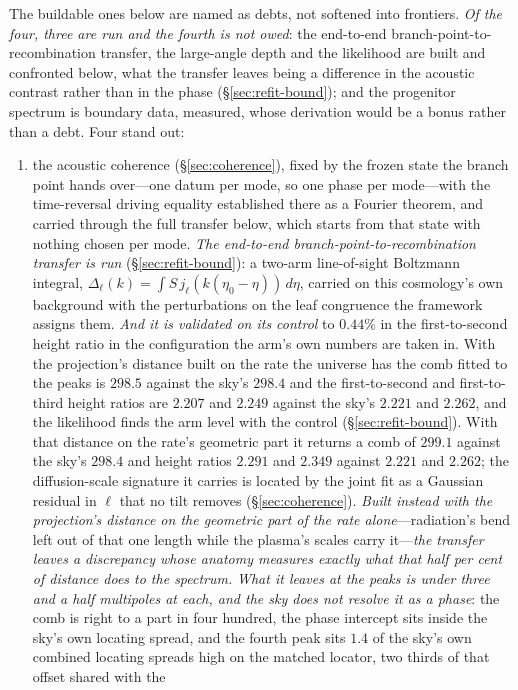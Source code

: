 \documentclass[11pt,a4paper]{article}
\theoremstyle{plain}
\theoremstyle{definition}
\theoremstyle{remark}
\begin{document}
The buildable ones below are named as debts, not softened into frontiers. \emph{Of the four, three are run and the fourth is not owed}: the end-to-end branch-point-to-recombination transfer, the large-angle depth and the likelihood are built and confronted below, what the transfer leaves being a difference in the acoustic contrast rather than in the phase (\S\ref{sec:refit-bound}); and the progenitor spectrum is boundary data, measured, whose derivation would be a bonus rather than a debt. Four stand out:
\begin{enumerate}
\item the acoustic coherence (\S\ref{sec:coherence}), fixed by the frozen state the branch point hands over---one datum per mode, so one phase per mode---with the time-reversal driving equality established there as a Fourier theorem, and carried through the full transfer below, which starts from that state with nothing chosen per mode. \emph{The end-to-end branch-point-to-recombination transfer is run} (\S\ref{sec:refit-bound}): a two-arm line-of-sight Boltzmann integral, $\Delta_\ell(k)=\int S\,j_\ell(k(\eta_0-\eta))\,d\eta$, carried on this cosmology's own background with the perturbations on the leaf congruence the framework assigns them. \emph{And it is validated on its control} to $0.44\%$ in the first-to-second height ratio in the configuration the arm's own numbers are taken in. With the projection's distance built on the rate the universe has the comb fitted to the peaks is $298.5$ against the sky's $298.4$ and the first-to-second and first-to-third height ratios are $2.207$ and $2.249$ against the sky's $2.221$ and $2.262$, and the likelihood finds the arm level with the control (\S\ref{sec:refit-bound}). With that distance on the rate's geometric part it returns a comb of $299.1$ against the sky's $298.4$ and height ratios $2.291$ and $2.349$ against $2.221$ and $2.262$; the diffusion-scale signature it carries is located by the joint fit as a Gaussian residual in $\ell$ that no tilt removes (\S\ref{sec:coherence}). \emph{Built instead with the projection's distance on the geometric part of the rate alone}---radiation's bend left out of that one length while the plasma's scales carry it---\emph{the transfer leaves a discrepancy whose anatomy measures exactly what that half per cent of distance does to the spectrum.} \emph{What it leaves at the peaks is under three and a half multipoles at each, and the sky does not resolve it as a phase}: the comb is right to a part in four hundred, the phase intercept sits inside the sky's own locating spread, and the fourth peak sits $1.4$ of the sky's own combined locating spreads high on the matched locator, two thirds of that offset shared with the 
\end{enumerate}
\end{document}

